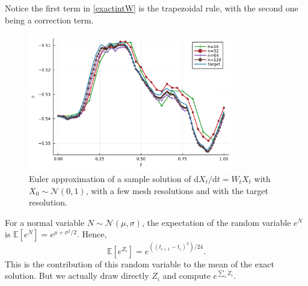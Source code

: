 \documentclass[reqno,12pt]{amsart}
\theoremstyle{plain} %
\theoremstyle{definition} %
\begin{document}
Notice the first term in \cref{exactintW} is the trapezoidal rule, with the second one being a correction term.

\begin{figure}
    \centerline{\includegraphics[width=0.8\textwidth]{img/approximation_linearhomogenous.pdf}}
    \caption{Euler approximation of a sample solution of $\mathrm{d}X_t/\mathrm{d}t = W_t X_t$ with $X_0 \sim \mathcal{N}(0, 1)$, with a few mesh resolutions and with the target resolution.}
    \label{samplepathslinearhomogeneousrode}
\end{figure}

For a normal variable $N \sim \mathcal{N}(\mu, \sigma)$, the expectation of the random variable $e^N$ is $\mathbb{E}[e^N] = e^{\mu + \sigma^2/2}$. Hence,
\begin{equation}
    \label{Xtlinearhomogeneousrodeestimateexponentialofnomral}
    \mathbb{E}[e^{Z_i}] = e^{((t_{i+1}- t_i)^3)/24}.
\end{equation}
This is the contribution of this random variable to the mean of the exact solution. But we actually draw directly $Z_i$ and compute $e^{\sum_i Z_i}$.
\end{document}

